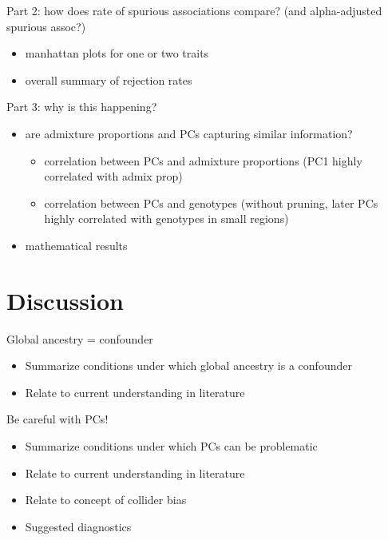 \documentclass[12pt]{article}
\begin{document}
\noindent Part 2: how does rate of spurious associations compare? (and alpha-adjusted spurious assoc?)

\begin{itemize}
\item manhattan plots for one or two traits
\item overall summary of rejection rates
\end{itemize}

\noindent Part 3: why is this happening?

\begin{itemize}
\item are admixture proportions and PCs capturing similar information?
	\begin{itemize}
	\item correlation between PCs and admixture proportions (PC1 highly correlated with admix prop)
	\item correlation between PCs and genotypes (without pruning, later PCs highly correlated with genotypes in small regions)
	\end{itemize}
\item mathematical results
\end{itemize}


%
%


\section{Discussion}


Global ancestry = confounder
\begin{itemize}
\item Summarize conditions under which global ancestry is a confounder 
\item Relate to current understanding in literature
\end{itemize}

\noindent Be careful with PCs!
\begin{itemize}
\item Summarize conditions under which PCs can be problematic
\item Relate to current understanding in literature
\item Relate to concept of collider bias
\item Suggested diagnostics
\end{itemize}
\end{document}
